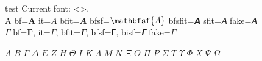 \documentclass{article}
\begin{document}
test  Current font: <\fontname\font>.
\\


A bf=$\mathbf{A}$ it=$\mathit{A}$ bfit=$\mathbfit{A}$ bfsf=$\mathbfsf{A}$ bfsfit=$\mathbfsfit{A}$ sfit=$\mathsfit{A}$ fake=$\boldsymbol{\mathsfit{A}}$ \\

$\Gamma$ bf=$𝚪$, it=$𝛤$, bfit=$𝜞$, bfsf=$𝝘$, bisf=$𝞒$ fake=$\boldsymbol{\mathsfit{\Gamma}}$



$𝛢$
$𝛣$
$𝛤$
$𝛥$
$𝛦$
$𝛧$
$𝛨$
$𝛩$
$𝛪$
$𝛫$
$𝛬$
$𝛭$
$𝛮$
$𝛯$
$𝛰$
$𝛱$
$𝛲$
$𝛴$
$𝛵$
$𝛶$
$𝛷$
$𝛸$
$𝛹$
$𝛺$
\end{document}
